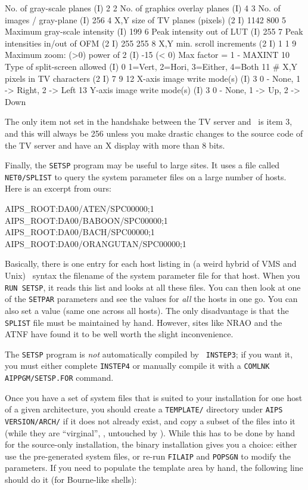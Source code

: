   No. of gray-scale planes         (I)     2
2  No. of graphics overlay planes   (I)     4
3  No. of images / gray-plane       (I)   256
4  X,Y size of TV planes (pixels) (2 I)  1142   800
5  Maximum gray-scale intensity     (I)   199
6  Peak intensity out of LUT        (I)   255
7  Peak intensities in/out of OFM (2 I)   255   255
8  X,Y min. scroll increments     (2 I)     1     1
9  Maximum zoom: (>0) power of 2    (I)   -15
      (< 0) Max factor = 1 - MAXINT
10 Type of split-screen allowed     (I)     0
      1=Vert, 2=Hori, 3=Either, 4=Both
11 # X,Y pixels in TV characters  (2 I)     7     9
12 X-axis image write mode(s)       (I)     3
      0 - None, 1 -> Right, 2 -> Left
13 Y-axis image write mode(s)       (I)     3
      0 - None, 1 -> Up, 2 -> Down
\endfortran

\medskip\noindent
The only item not set in the handshake between the TV server and
\ttaips\ is item 3, and this will always be 256 unless you make drastic
changes to the source code of the TV server and have an X display with
more than 8 bits.

Finally, the {\tt SETSP} program may be useful to large sites.  It uses a
file called {\tt\dol NET0/SPLIST} to query the system parameter files on a
large number of hosts.  Here is an excerpt from ours:\medskip

\fortran
AIPS_ROOT:DA00/ATEN/SPC00000;1
AIPS_ROOT:DA00/BABOON/SPC00000;1
AIPS_ROOT:DA00/BACH/SPC00000;1
AIPS_ROOT:DA00/ORANGUTAN/SPC00000;1
\endfortran
\medskip

\noindent Basically, there is one entry for each host listing in
(a weird hybrid of VMS and Unix) \AIPS\ syntax the filename of the
system parameter file for that host.  When you {\tt RUN SETSP}, it reads
this list and looks at all these files.  You can then look at one of the
{\tt SETPAR} parameters and see the values for {\it all\/} the hosts in
one go.  You can also set a value (same one across all hosts).  The only
disadvantage is that the {\tt SPLIST} file must be maintained by hand.
However, sites like NRAO and the ATNF have found it to be well worth the
slight inconvenience.

The {\tt SETSP} program is {\it not\/} automatically compiled by {\tt
INSTEP3}; if you want it, you must either complete {\tt INSTEP4} or
manually compile it with a {\tt COMLNK \dol AIPPGM/SETSP.FOR} command.
\medskip


Once you have a set of system files that is suited to your installation
for one host of a given architecture, you should create a {\tt TEMPLATE/}
directory under {\tt\dol AIPS VERSION/\dol ARCH/} if it does not
already exist, and copy a subset of the files into it (while they are
``virginal'', \ie, untouched by \AIPS).  While this has to be done by hand
for the source-only installation, the binary installation gives you a
choice: either use the pre-generated system files, or re-run {\tt FILAIP}
and {\tt POPSGN} to modify the parameters.  If you need to populate the
template area by hand, the following line should do it (for Bourne-like
shells):\medskip

